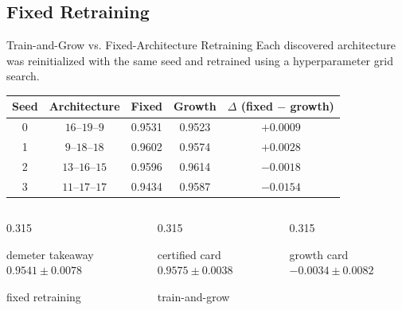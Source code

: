 \subsection{Fixed Retraining}

\begin{frame}[t]{Train-and-Grow vs. Fixed-Architecture Retraining}
  \vspace{-0.13cm}
  {\fontsize{7.45}{8.9}\selectfont
  Each discovered architecture was reinitialized with the same seed and
  retrained using a hyperparameter grid search.}

  \vspace{0.11cm}
  {\centering
  \fontsize{7.15}{8.6}\selectfont
  \setlength{\tabcolsep}{8.5pt}
  \renewcommand{\arraystretch}{1.30}
  \begin{tabular}{c|c|c|c|c}
    \textbf{Seed} & \textbf{Architecture} & \textbf{Fixed} & \textbf{Growth}
    & $\Delta$ \textbf{(fixed $-$ growth)} \\
    \hline
    0 & $16$--$19$--$9$  & 0.9531 & 0.9523 & $+0.0009$ \\
    1 & $9$--$18$--$18$  & 0.9602 & 0.9574 & $+0.0028$ \\
    2 & $13$--$16$--$15$ & 0.9596 & 0.9614 & $-0.0018$ \\
    3 & $11$--$17$--$17$ & 0.9434 & 0.9587 & $-0.0154$
  \end{tabular}\par}

  \vspace{0.15cm}
  \begin{columns}[T,onlytextwidth]
    \begin{column}{0.315\textwidth}
      \begin{beamercolorbox}[rounded=true,sep=0.12cm,wd=\linewidth]{demeter takeaway}
        \centering
        {\color{LisnNavy}\fontsize{11.5}{13.5}\selectfont\bfseries
        $0.9541\pm0.0078$}

        {\fontsize{6.5}{7.8}\selectfont fixed retraining}
      \end{beamercolorbox}
    \end{column}
    \begin{column}{0.315\textwidth}
      \begin{beamercolorbox}[rounded=true,sep=0.12cm,wd=\linewidth]{certified card}
        \centering
        {\color{CertifiedGreen}\fontsize{11.5}{13.5}\selectfont\bfseries
        $0.9575\pm0.0038$}

        {\fontsize{6.5}{7.8}\selectfont train-and-grow}
      \end{beamercolorbox}
    \end{column}
    \begin{column}{0.315\textwidth}
      \begin{beamercolorbox}[rounded=true,sep=0.12cm,wd=\linewidth]{growth card}
        \centering
        {\color{AccentOrange}\fontsize{11.5}{13.5}\selectfont\bfseries
        $-0.0034\pm0.0082$}


\end{beamercolorbox}
\end{column}
\end{columns}
\end{frame}
